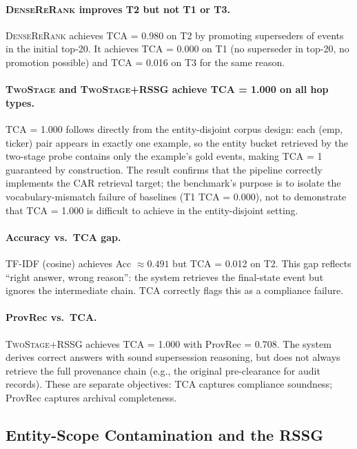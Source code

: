 \documentclass[11pt]{article}
\newcommand{\sys}{\textsc{TwoStage}}
\newcommand{\sysplus}{\textsc{TwoStage+RSSG}}
\newcommand{\sysbase}{\textsc{DenseReRank}}
\begin{document}
\paragraph{\sysbase{} improves T2 but not T1 or T3.} \sysbase{} achieves TCA = 0.980 on T2 by promoting superseders of events in the initial top-20. It achieves TCA = 0.000 on T1 (no superseder in top-20, no promotion possible) and TCA = 0.016 on T3 for the same reason.

\paragraph{\sys{} and \sysplus{} achieve TCA = 1.000 on all hop types.} TCA = 1.000 follows directly from the entity-disjoint corpus design: each (emp, ticker) pair appears in exactly one example, so the entity bucket retrieved by the two-stage probe contains only the example's gold events, making TCA = 1 guaranteed by construction. The result confirms that the pipeline correctly implements the CAR retrieval target; the benchmark's purpose is to isolate the vocabulary-mismatch failure of baselines (T1 TCA = 0.000), not to demonstrate that TCA = 1.000 is difficult to achieve in the entity-disjoint setting.

\paragraph{Accuracy vs.\ TCA gap.} TF-IDF (cosine) achieves Acc $\approx 0.491$ but TCA = 0.012 on T2. This gap reflects ``right answer, wrong reason'': the system retrieves the final-state event but ignores the intermediate chain. TCA correctly flags this as a compliance failure.

\paragraph{ProvRec vs.\ TCA.} \sysplus{} achieves TCA = 1.000 with ProvRec = 0.708. The system derives correct answers with sound supersession reasoning, but does not always retrieve the full provenance chain (e.g., the original pre-clearance for audit records). These are separate objectives: TCA captures compliance soundness; ProvRec captures archival completeness.

\subsection{Entity-Scope Contamination and the RSSG}
\label{sec:contamination}
\end{document}
